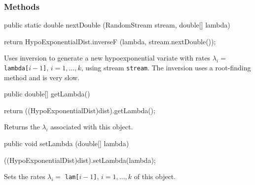 \subsubsection* {Methods}
\begin{code}
   
   public static double nextDouble (RandomStream stream, double[] lambda) \begin{hide} {
      return HypoExponentialDist.inverseF (lambda, stream.nextDouble());
   }\end{hide}
\end{code}
 \begin{tabb}  Uses inversion to generate a new hypoexponential variate
   with rates $\lambda_i = $ \texttt{lambda[$i-1$]}, $i = 1,\ldots,k$, 
   using stream \texttt{stream}. The inversion uses a root-finding method
  and is very slow.
 \end{tabb}
\begin{code}

   public double[] getLambda()\begin{hide} {
      return ((HypoExponentialDist)dist).getLambda();
   }
\end{hide}
\end{code}
\begin{tabb}
   Returns the $\lambda_i$ associated with this object.
\end{tabb}
\begin{code}

   public void setLambda (double[] lambda)\begin{hide} {
      ((HypoExponentialDist)dist).setLambda(lambda);
   }\end{hide}
\end{code}
\begin{tabb} Sets the rates $\lambda_i = $ \texttt{lam[$i-1$]}, 
$i = 1,\ldots,k$ of this object.
\end{tabb}
\begin{code}\begin{hide}
}\end{hide}
\end{code}
